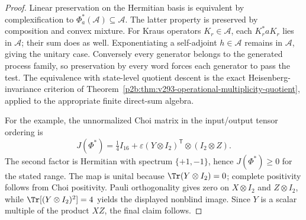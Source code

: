 \documentclass[12pt,a4paper]{article}
\begin{document}
\begin{proof}
Linear preservation on the Hermitian basis is equivalent by
complexification to $\Phi_a^*(\mathcal A)\subseteq\mathcal A$.
The latter property is preserved by composition and convex mixture.
For Kraus operators $K_r\in\mathcal A$, each $K_r^*aK_r$
lies in $\mathcal A$; their sum does as well. Exponentiating a
self-adjoint $h\in\mathcal A$ remains in $\mathcal A$, giving the
unitary case.
Conversely every generator belongs to the generated process family,
so preservation by every word forces each generator to pass the test.
The equivalence with state-level quotient descent is the exact
Heisenberg-invariance criterion of
Theorem~\ref{p2b:thm:v293-operational-multiplicity-quotient}, applied
to the appropriate finite direct-sum algebra.

For the example, the unnormalized Choi matrix in the input/output
tensor ordering is
\[
 J(\Phi^*)=\tfrac14I_{16}
 +\varepsilon(Y\otimes I_2)^{\mathsf T}\otimes(I_2\otimes Z).
\]
The second factor is Hermitian with spectrum $\{+1,-1\}$, hence
$J(\Phi^*)\ge0$ for the stated range. The map is unital because
$\Tr(Y\otimes I_2)=0$; complete positivity follows from Choi
positivity. Pauli orthogonality gives zero on $X\otimes I_2$ and
$Z\otimes I_2$, while $\Tr[(Y\otimes I_2)^2]=4$ yields the displayed
nonblind image. Since $Y$ is a scalar multiple of the product $XZ$,
the final claim follows.
\end{proof}
\end{document}
